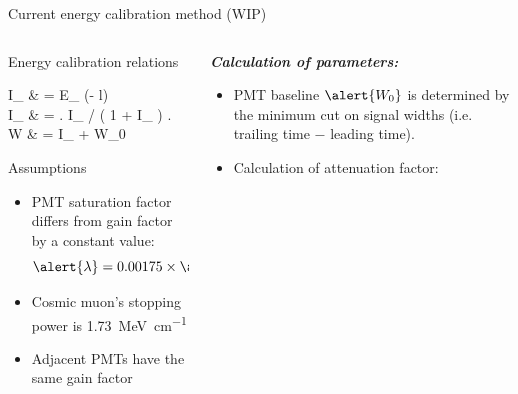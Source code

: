 \documentclass{ikpKoeln}
\begin{document}
\begin{frame}[t]{Current energy calibration method (WIP)}
	\begin{columns}[c]
		\begin{column}{0.45 \textwidth}
			\vspace{-1.5em}
			\begin{alertblock}{Energy calibration relations}
				\setlength{\abovedisplayskip}{0pt}
				\setlength{\belowdisplayskip}{0pt}
				\setlength{\abovedisplayshortskip}{0pt}
				\setlength{\belowdisplayshortskip}{0pt}
				\begin{flalign}
					I_ & = E_ \cdot \exp(-\alert{\alpha} \cdot l)                                           \\
					I_ & = \left. I_ \middle/ \left( 1 + \alert{\lambda} \cdot I_ \right) \right. \\
					W            & = \alert{} \cdot I_ + \alert{W_0}
				\end{flalign}
			\end{alertblock}
			\vspace{-0.5em}
			\begin{exampleblock}{Assumptions}
				\begin{itemize}
					\setlength\itemsep{0em}
					\item PMT saturation factor differs from gain factor by a constant value: \vspace{-1em}$$\alert{\lambda} = 0.00175 \times \alert{\mathcal{G}}$$
					\item \vspace{-1em}Cosmic muon's stopping power is \qty{1.73}{\mega\electronvolt\per\centi\metre}
					\item Adjacent PMTs have the same gain factor
				\end{itemize}
			\end{exampleblock}
		\end{column}
		\begin{column}{0.45 \textwidth}
			\textit{\textbf{Calculation of parameters:}}
			{\small
				\begin{itemize}
					\setlength\itemsep{0em}
					\item PMT baseline $\alert{W_0}$ is determined by the minimum cut on signal widths (i.e. trailing time $-$ leading time).
					\item Calculation of attenuation factor:

\end{itemize}}
\end{column}
\end{columns}
\end{frame}
\end{document}
